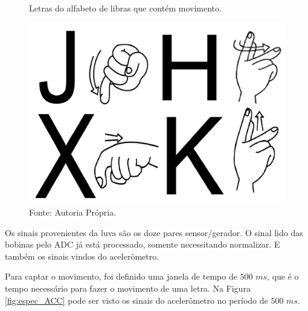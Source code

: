 \begin{figure}[H]
	\vspace{4mm}
	\centering
	\caption{Letras do alfabeto de libras que contém movimento.}
	\label{fig:letrasMov}
	\includegraphics[scale=0.2]{imagens/letras_movimento}	
	\caption*{Fonte: Autoria Própria.}
\end{figure}

Os sinais provenientes da luva são os doze pares sensor/gerador. O sinal lido das bobinas pelo ADC já está processado, somente necessitando normalizar. E também os sinais vindos do acelerômetro.

Para captar o movimento, foi definido uma janela de tempo de $500$ $ms$, que é o tempo necessário para fazer o movimento de uma letra. Na Figura \ref{fig:espec_ACC} pode ser visto os sinais do acelerômetro no período de $500$ $ms$.

